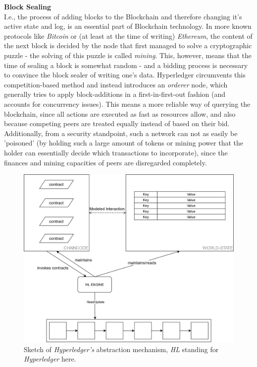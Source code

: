 \textbf{Block Sealing} \\[0.2em]
I.e., the process of adding blocks to the Blockchain and therefore changing it's active state and log, is an essential part of Blockchain technology. In more known protocols like \emph{Bitcoin} or (at least at the time of writing) \emph{Ethereum}, the content of the next block is decided by the node that first managed to solve a cryptographic puzzle - the solving of this puzzle is called \emph{mining}. This, however, means that the time of sealing a block is somewhat random - and a bidding process is necessary to convince the block sealer of writing one's data. \newline
Hyperledger circumvents this competition-based method and instead introduces an \emph{orderer} node, which generally tries to apply block-additions in a first-in-first-out fashion (and accounts for concurrency issues). This means a more reliable way of querying the blockchain, since all actions are executed as fast as resources allow, and also because competing peers are treated equally instead of based on their bid. \newline
Additionally, from a security standpoint, such a network can not as easily be 'poisoned' (by holding such a large amount of tokens or mining power that the holder can essentially decide which transactions to incorporate), since the finances and mining capacities of peers are disregarded completely.

\begin{figure}[h]
	\centering
	\captionsetup{justification=centering,margin=2cm}
	\includegraphics[height=0.7\textwidth]{gfx/hl-abstraction}
	\caption{Sketch of \emph{Hyperledger's} abstraction mechanism, \emph{HL} standing for \emph{Hyperledger} here.}
	\label{fig:impr:hl:basics:abstraction}
\end{figure}

